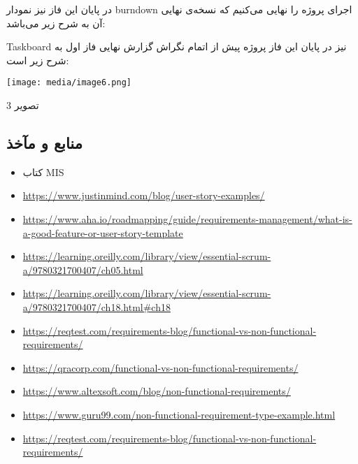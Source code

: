 \documentclass[]{article}
\begin{document}
در پایان این فاز نیز نمودار burndown اجرای پروژه را نهایی می‌کنیم که
نسخه‌ی نهایی آن به شرح زیر می‌باشد:

Taskboard نیز در پایان این فاز پروژه پیش از اتمام نگراش گزارش نهایی فاز
اول به شرح زیر است:

\texttt{[image: media/image6.png]}

تصویر 3

\subsection{منابع و
مآخذ}\label{ux645ux646ux627ux628ux639-ux648-ux645ux622ux62eux630}

\begin{itemize}
\item
  کتاب MIS
\end{itemize}

\begin{itemize}
\item
  \url{https://www.justinmind.com/blog/user-story-examples/}
\item
  \url{https://www.aha.io/roadmapping/guide/requirements-management/what-is-a-good-feature-or-user-story-template}
\item
  \url{https://learning.oreilly.com/library/view/essential-scrum-a/9780321700407/ch05.html}
\item
  \url{https://learning.oreilly.com/library/view/essential-scrum-a/9780321700407/ch18.html\#ch18}
\item
  \url{https://reqtest.com/requirements-blog/functional-vs-non-functional-requirements/}
\item
  \url{https://qracorp.com/functional-vs-non-functional-requirements/}
\item
  \url{https://www.altexsoft.com/blog/non-functional-requirements/}
\item
  \url{https://www.guru99.com/non-functional-requirement-type-example.html}
\item
  \url{https://reqtest.com/requirements-blog/functional-vs-non-functional-requirements/}
\end{itemize}
\end{document}
